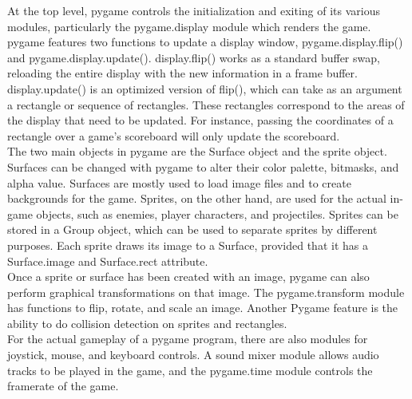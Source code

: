At the top level, pygame controls the initialization and exiting of its various modules, particularly the pygame.display module which renders the game. pygame features two functions to update a display window, pygame.display.flip() and pygame.display.update(). display.flip() works as a standard buffer swap, reloading the entire display with the new information in a frame buffer. display.update() is an optimized version of flip(), which can take as an argument a rectangle or sequence of rectangles. These rectangles correspond to the areas of the display that need to be updated. For instance, passing the coordinates of a rectangle over a game's scoreboard will only update the scoreboard.\\

The two main objects in pygame are the Surface object and the sprite object. Surfaces can be changed with pygame to alter their color palette, bitmasks, and alpha value. Surfaces are mostly used to load image files and to create backgrounds for the game. Sprites, on the other hand, are used for the actual in-game objects, such as enemies, player characters, and projectiles. Sprites can be stored in a Group object, which can be used to separate sprites by different purposes. Each sprite draws its image to a Surface, provided that it has a Surface.image and Surface.rect attribute.\\

Once a sprite or surface has been created with an image, pygame can also perform graphical transformations on that image. The pygame.transform module has functions to flip, rotate, and scale an image. Another Pygame feature is the ability to do collision detection on sprites and rectangles.\\

For the actual gameplay of a pygame program, there are also modules for joystick, mouse, and keyboard controls. A sound mixer module allows audio tracks to be played in the game, and the pygame.time module controls the framerate of the game.